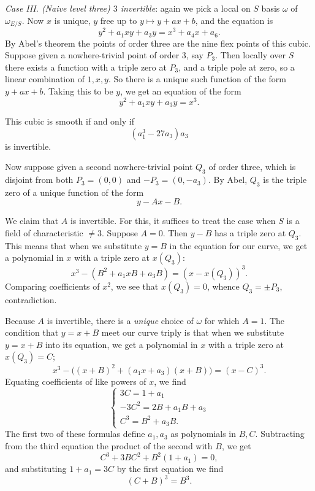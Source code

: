 \kmitem\label{item:2.2.10}
\emph{Case III. (Naive level three) $3$ invertible}: again we pick a local on $S$ basis $\omega$ of $\omega_{E/S}$. Now $x$ is unique, $y$ free up to $y \mapsto y + ax + b$, and the equation is
\[
y^2 + a_1 xy + a_3 y = x^3 + a_4 x + a_6.
\]
By Abel's theorem the points of order three are the nine flex points of this cubic. Suppose given a nowhere-trivial point of order $3$, say $P_3$. Then locally over $S$ there exists a function with a triple zero at $P_3$, and a triple pole at zero, so a linear combination of $1, x, y$. So there is a unique such function of the form $y + ax + b$. Taking this to be $y$, we get an equation of the form
\[
y^2 + a_1 xy + a_3 y = x^3.
\]

\noindent This cubic is smooth if and only if
\[
(a_1^3 - 27 a_3) a_3
\]
is invertible.

\noindent Now suppose given a second nowhere-trivial point $Q_3$ of order three, which is disjoint from both $P_3 = (0, 0)$ and $-P_3 = (0, -a_3)$. By Abel, $Q_3$ is the triple zero of a unique function of the form
\[
y - Ax - B.
\]

\noindent We claim that $A$ is invertible. For this, it suffices to treat the case when $S$ is a field of characteristic $\ne 3$. Suppose $A = 0$. Then $y - B$ has a triple zero at $Q_3$. This means that when we substitute $y = B$ in the equation for our curve, we get a polynomial in $x$ with a triple zero at $x(Q_3)$:
\[
x^3 - (B^2 + a_1 xB + a_3 B) = (x - x(Q_3))^3.
\]
Comparing coefficients of $x^2$, we see that $x(Q_3) = 0$, whence $Q_3 = \pm P_3$, contradiction.

\noindent Because $A$ is invertible, there is a \emph{unique} choice of $\omega$ for which $A = 1$. The condition that $y = x + B$ meet our curve triply is that when we substitute $y = x + B$ into its equation, we get a polynomial in $x$ with a triple zero at $x(Q_3) = C$;
\begin{equation*}\tag{$*$}
x^3 - \bigl((x + B)^2 + (a_1 x + a_3)(x + B)\bigr) = (x - C)^3.
\end{equation*}
Equating coefficients of like powers of $x$, we find
\[
\begin{cases}
3C = 1 + a_1 \\
-3C^2 = 2B + a_1 B + a_3 \\
C^3 = B^2 + a_3 B.
\end{cases}
\]
The first two of these formulas define $a_1, a_3$ as polynomials in $B, C$. Subtracting from the third equation the product of the second with $B$, we get
\[
C^3 + 3BC^2 + B^2(1 + a_1) = 0,
\]
and substituting $1 + a_1 = 3C$ by the first equation we find
\[
(C + B)^3 = B^3.
\]

